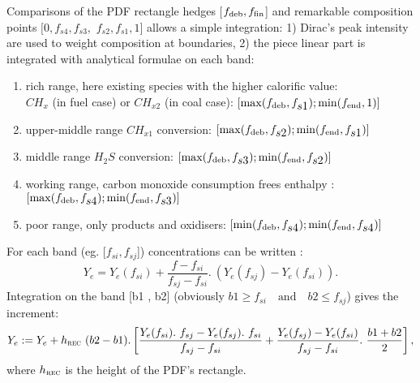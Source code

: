 Comparisons of the PDF rectangle hedges [$f_{\mbox{\scriptsize deb}} ,
f_{\mbox{\scriptsize fin}}$] and remarkable composition points $[0,
f_{\displaystyle s4}, f_{\displaystyle s3},$ $f_{\displaystyle s2},
f_{\displaystyle s1}, 1]$ allows a simple integration: 1) Dirac's peak
intensity are used to weight composition at boundaries, 2) the piece linear part
is integrated with analytical formulae on each band:

\begin{enumerate}
\item rich range, here existing species with the higher calorific value: \\
  \hspace{0.25cm}$CH_{x}$ (in fuel case) or $CH_{x2}$ (in coal case):
  $[\max(f_{\mbox{\scriptsize deb}},f_{\displaystyle s1}) ;
  \min(f_{\mbox{\scriptsize end}},1)]$
\item upper-middle range $CH_{x1}$ conversion: $[\max(f_{\mbox{\scriptsize
      deb}},f_{\displaystyle s2} ); \min (f_{\mbox{\scriptsize
      end}},f_{\displaystyle s1})]$
\item middle range $H_{2}S$ conversion: $[\max(f_{\mbox{\scriptsize
      deb}},f_{\displaystyle s3} ); \min (f_{\mbox{\scriptsize
      end}},f_{\displaystyle s2})]$
\item working range, carbon monoxide consumption frees enthalpy :
  $[\max(f_{\mbox{\scriptsize deb}},f_{\displaystyle s4} ); \min
  (f_{\mbox{\scriptsize end}},f_{\displaystyle s3})]$
\item poor range, only products and oxidisers: $[\min(f_{\mbox{\scriptsize
      deb}},f_{\displaystyle s4} ); \min (f_{\mbox{\scriptsize
      end}},f_{\displaystyle s4})]$
\end{enumerate}
For each band (eg. [$f_{\displaystyle si} , f_{\displaystyle sj}$])
concentrations can be written :
\begin{equation*}
  Y_e = Y_{e}(f_{si}) + \dfrac{f-f_{si}}{f_{sj}-f_{si}} .~ \left( Y_{e}(f_{sj})-Y_{e}(f_{si}) \right).
\end{equation*}
Integration on the band [b1 , b2] (obviously $b1 \geq f_{si} \quad \text{and}
\quad b2 \leq f_{sj}$) gives the increment:
\begin{equation*}
  Y_{e} :=  Y_e + h_{\mbox{\scriptsize \textsc{rec}}}~(b2-b1)  .  \left[ \dfrac{Y_{e}(f_{si}).~f_{sj}-Y_{e}(f_{sj}).~f_{si}}{f_{sj}-f_{si}}
   +         \dfrac{Y_{e}(f_{sj})-Y_{e}(f_{si})}{f_{sj}-f_{si}}.~\dfrac{b1+b2}{2} \right],
\end{equation*}
where $h_{\mbox{\scriptsize \textsc{rec}}}$ is the height of the PDF's
rectangle.

